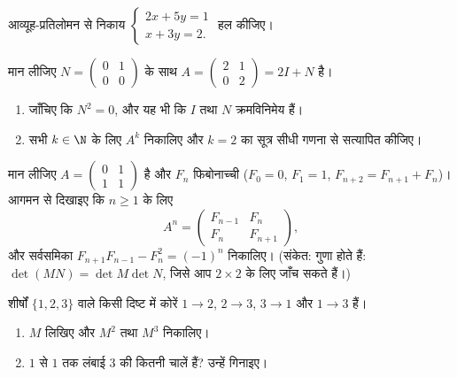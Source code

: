\begin{exercise}[$\star$]\label{exo:g12:matrix:3}
आव्यूह-प्रतिलोमन से निकाय
$\begin{cases} 2x + 5y = 1\\ x + 3y = 2 . \end{cases}$
हल कीजिए।
\end{exercise}

\begin{exercise}[$\star\star$]\label{exo:g12:matrix:4}
मान लीजिए $N = \begin{pmatrix} 0 & 1\\ 0 & 0 \end{pmatrix}$ के साथ $A = \begin{pmatrix} 2 & 1\\ 0 & 2\end{pmatrix} = 2I + N$ है।
\begin{enumerate}
  \item जाँचिए कि $N^2 = 0$, और यह भी कि $I$ तथा $N$ क्रमविनिमेय हैं।
  \item सभी $k \in \N$ के लिए $A^k$ निकालिए और $k=2$ का सूत्र सीधी गणना से
        सत्यापित कीजिए।
\end{enumerate}
\end{exercise}

\begin{exercise}[$\star\star$]\label{exo:g12:matrix:5}
मान लीजिए $A = \begin{pmatrix} 0 & 1\\ 1 & 1\end{pmatrix}$ है और $F_n$ फिबोनाच्ची  ($F_0 = 0$, $F_1 = 1$, $F_{n+2} = F_{n+1} + F_n$)। आगमन
से दिखाइए कि $n \geq 1$ के लिए
\[
A^n = \begin{pmatrix} F_{n-1} & F_n\\ F_n & F_{n+1}\end{pmatrix},
\]
और सर्वसमिका $F_{n+1}F_{n-1} - F_n^2 = (-1)^n$ निकालिए। (संकेत:  गुणा होते हैं: $\det(MN) = \det M \det N$, जिसे आप
$2\times2$  के लिए जाँच सकते हैं।)
\end{exercise}

\begin{exercise}[$\star\star$]\label{exo:g12:matrix:6}
शीर्षों $\{1, 2, 3\}$ वाले किसी दिष्ट  में कोरें $1\to2$, $2\to3$, $3\to1$ और $1\to3$
हैं।
\begin{enumerate}
  \item {} $M$ लिखिए और $M^2$ तथा $M^3$ निकालिए।
  \item $1$ से $1$ तक लंबाई $3$ की कितनी चालें हैं? उन्हें गिनाइए।
\end{enumerate}
\end{exercise}

